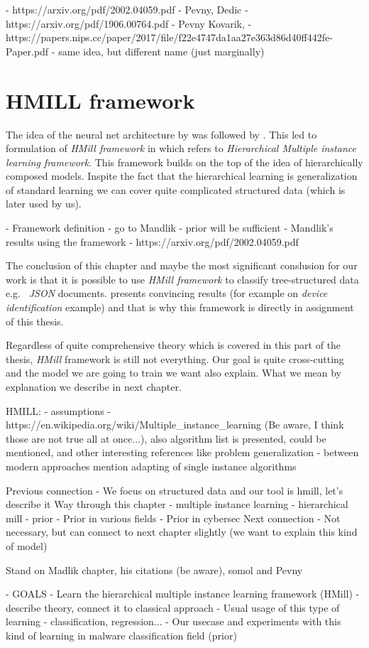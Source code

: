         - https://arxiv.org/pdf/2002.04059.pdf - Pevny, Dedic
        - https://arxiv.org/pdf/1906.00764.pdf - Pevny Kovarik, 
        - https://papers.nips.cc/paper/2017/file/f22e4747da1aa27e363d86d40ff442fe-Paper.pdf - same idea, but different name (just marginally)

\section{HMILL framework}
The idea of the neural net architecture by  was followed by . This led to formulation of \emph{HMill framework} in \cite{Mandlik2020} which refers to \emph{Hierarchical Multiple instance learning framework}. This framework builds on the top of the idea of hierarchically composed models. Inspite the fact that the hierarchical learning is generalization of standard learning we can cover quite complicated structured data (which is later used by us).

- Framework definition
    - go to Mandlik
- prior will be sufficient
    - Mandlik's results using the framework
    - https://arxiv.org/pdf/2002.04059.pdf

The conclusion of this chapter and maybe the most significant conslusion for our work is that it is possible to use \emph{HMill framework} to classify tree-structured data e.g. \ \emph{JSON} documents. \citeauthor{Mandlik2020} presents convincing results (for example on \emph{device identification} example) and that is why this framework is directly in assignment of this thesis.

Regardless of quite comprehensive theory which is covered in this part of the thesis, \emph{HMill} framework is still not everything. Our goal is quite cross-cutting and the model we are going to train we want also explain. What we mean by explanation we describe in next chapter.


HMILL:
- assumptions - https://en.wikipedia.org/wiki/Multiple_instance_learning (Be aware, I think those are not true all at once...), also algorithm list is presented, could be mentioned, and other interesting references like problem generalization
- between modern approaches mention adapting of single instance algorithms

Previous connection
- We focus on structured data and our tool is hmill, let's describe it
Way through this chapter
- multiple instance learning
- hierarchical mill
- prior
    - Prior in various fields
    - Prior in cybersec
Next connection
- Not necessary, but can connect to next chapter slightly (we want to explain this kind of model)

Stand on Madlik chapter, his citations (be aware), somol and Pevny


- GOALS 
- Learn the hierarchical multiple instance learning framework (HMill)
- describe theory, connect it to classical approach
- Usual usage of this type of learning - classification, regression...
- Our usecase and experiments with this kind of learning in malware classification field (prior)